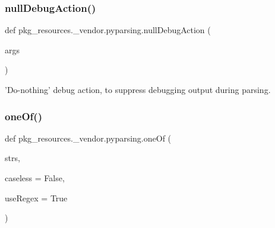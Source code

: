 \subsubsection{\texorpdfstring{null\+Debug\+Action()}{nullDebugAction()}}
{\footnotesize\ttfamily def pkg\+\_\+resources.\+\_\+vendor.\+pyparsing.\+null\+Debug\+Action (\begin{DoxyParamCaption}\item[{}]{args }\end{DoxyParamCaption})}

\begin{DoxyVerb}'Do-nothing' debug action, to suppress debugging output during parsing.\end{DoxyVerb}
 \mbox{\label{namespacepkg__resources_1_1__vendor_1_1pyparsing_a21bd7ad8315ec4ff917eb4c83abcac85}} 
\subsubsection{\texorpdfstring{one\+Of()}{oneOf()}}
{\footnotesize\ttfamily def pkg\+\_\+resources.\+\_\+vendor.\+pyparsing.\+one\+Of (\begin{DoxyParamCaption}\item[{}]{strs,  }\item[{}]{caseless = {\ttfamily False},  }\item[{}]{use\+Regex = {\ttfamily True} }\end{DoxyParamCaption})}

